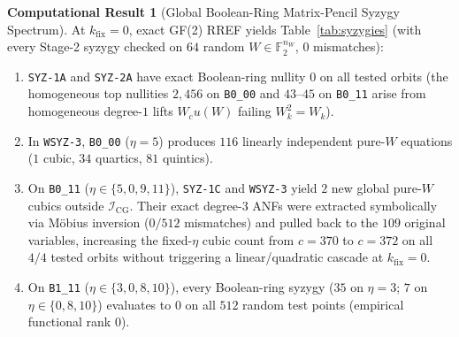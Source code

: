 \documentclass[11pt,a4paper]{article}
\theoremstyle{definition}
\newtheorem{compresult}[theorem]{Computational Result}
\newcommand{\F}{\mathbb{F}_2}
\begin{document}
\begin{compresult}[Global Boolean-Ring Matrix-Pencil Syzygy Spectrum]
\label{res:syzygies}
At $k_{\mathrm{fix}} = 0$, exact GF(2) RREF yields Table~\ref{tab:syzygies} (with every Stage-2 syzygy checked on $64$ random $W \in \F^{n_W}$, $0$ mismatches):
\begin{enumerate}
  \item \texttt{SYZ-1A} and \texttt{SYZ-2A} have exact Boolean-ring nullity $0$ on all tested orbits (the homogeneous top nullities $2{,}456$ on \texttt{B0\_00} and $43$--$45$ on \texttt{B0\_11} arise from homogeneous degree-$1$ lifts $W_c u(W)$ failing $W_k^2 = W_k$).
  \item In \texttt{WSYZ-3}, \texttt{B0\_00} ($\eta=5$) produces $116$ linearly independent pure-$W$ equations ($1$ cubic, $34$ quartics, $81$ quintics).
  \item On \texttt{B0\_11} ($\eta \in \{5, 0, 9, 11\}$), \texttt{SYZ-1C} and \texttt{WSYZ-3} yield $2$ new global pure-$W$ cubics outside $\mathcal{I}_{\mathrm{CG}}$. Their exact degree-$3$ ANFs were extracted symbolically via M\"obius inversion ($0/512$ mismatches) and pulled back to the $109$ original variables, increasing the fixed-$\eta$ cubic count from $c=370$ to $c=372$ on all $4/4$ tested orbits without triggering a linear/quadratic cascade at $k_{\mathrm{fix}}=0$.
  \item On \texttt{B1\_11} ($\eta \in \{3, 0, 8, 10\}$), every Boolean-ring syzygy ($35$ on $\eta=3$; $7$ on $\eta \in \{0, 8, 10\}$) evaluates to $0$ on all $512$ random test points (empirical functional rank $0$).
\end{enumerate}
\end{compresult}
\end{document}
